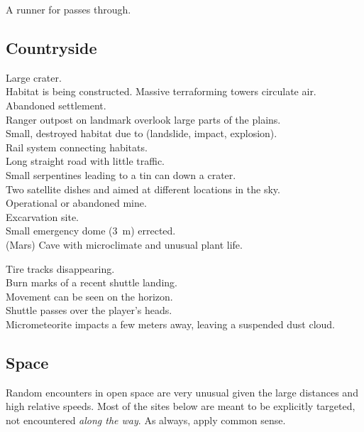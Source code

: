 \documentclass[a4]{article}
\begin{document}
\starttableone
A runner for  passes through.\\
\stoptableone






\subsection{Countryside}

\starttableone
Large crater.\\
Habitat is being constructed.
Massive terraforming towers circulate air.\\
Abandoned settlement.\\
Ranger outpost on landmark overlook large parts of the plains.\\
Small, destroyed habitat due to (landslide, impact, explosion).\\
Rail system connecting habitats.\\
Long straight road with little traffic.\\
Small serpentines leading to a tin can down a crater.\\
Two satellite dishes and aimed at different locations in the sky.\\
Operational or abandoned mine.\\
Excarvation site.\\
Small emergency dome (\SI{3}{\m}) errected.\\
(Mars) Cave with microclimate and unusual plant life.\\
\stoptableone


\starttableone
Tire tracks disappearing.\\
Burn marks of a recent shuttle landing.\\
Movement can be seen on the horizon.\\
Shuttle passes over the player's heads.\\
Micrometeorite impacts a few meters away, leaving a suspended dust cloud.\\
\stoptableone



\subsection{Space}

Random encounters in open space are very unusual given the large distances and high relative speeds.
Most of the sites below are meant to be explicitly targeted, not encountered \textit{along the way}.
As always, apply common sense.
\end{document}
